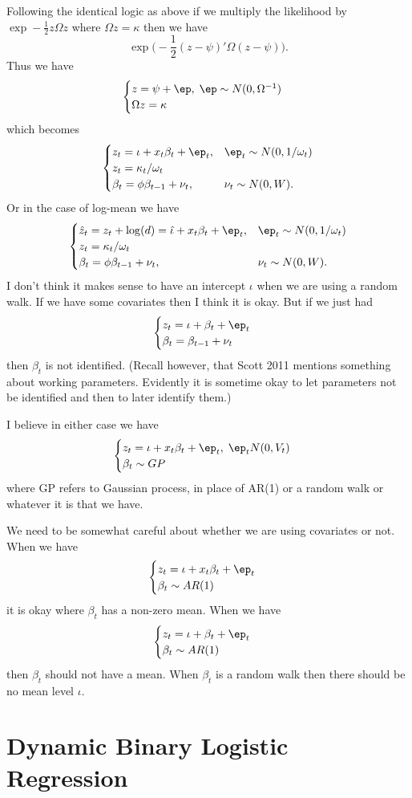 \documentclass{article}
\begin{document}
Following the identical logic as above if we multiply the likelihood by
$\exp - \frac{1}{2} z \Omega z$ where $\Omega z = \kappa$ then we have
\[
\exp \Big( -\frac{1}{2} (z - \psi)' \Omega (z- \psi) \Big).
\]
Thus we have
\[
\begin{cases}
z = \psi + \ep, \; \ep \sim N(0, \Omega^{-1}) \\
\Omega z = \kappa
\end{cases}
\]
which becomes
\[
\begin{cases}
z_t = \iota + x_t \beta_t + \ep_t, & \ep_t \sim N(0, 1/\omega_t) \\
z_t = \kappa_t / \omega_t \\
\beta_t = \phi \beta_{t-1} + \nu_t, & \nu_t \sim N(0, W).
\end{cases}
\]
Or in the case of log-mean we have
\[
\begin{cases}
\hat z_t = z_t + \log(d) = \hat \iota + x_t \beta_t + \ep_t, 
  & \ep_t \sim N(0, 1/\omega_t) \\
z_t = \kappa_t / \omega_t \\
\beta_t = \phi \beta_{t-1} + \nu_t, & \nu_t \sim N(0, W).
\end{cases}
\]
I don't think it makes sense to have an intercept $\iota$ when we are using a
random walk.  If we have some covariates then I think it is okay.  But if we
just had
\[
\begin{cases}
z_t = \iota + \beta_t + \ep_t \\
\beta_t = \beta_{t-1} + \nu_t
\end{cases}
\]
then $\beta_t$ is not identified.  (Recall however, that Scott 2011 mentions
something about working parameters.  Evidently it is sometime okay to let
parameters not be identified and then to later identify them.)

I believe in either case we have
\[
\begin{cases}
z_t = \iota + x_t \beta_t + \ep_t, \; \ep_t N(0, V_t) \\
\beta_t \sim GP
\end{cases}
\]
where GP refers to Gaussian process, in place of AR(1) or a random walk or
whatever it is that we have.

We need to be somewhat careful about whether we are using covariates or not.
When we have
\[
\begin{cases}
z_t = \iota + x_t \beta_t + \ep_t \\
\beta_t \sim AR(1)
\end{cases}
\]
it is okay where $\beta_t$ has a non-zero mean.
When we have
\[
\begin{cases}
z_t = \iota + \beta_t + \ep_t \\
\beta_t \sim AR(1)
\end{cases}
\]
then $\beta_t$ should not have a mean.  When $\beta_t$ is a random walk then
there should be no mean level $\iota$.

\section{Dynamic Binary Logistic Regression}



{}

\end{document}
